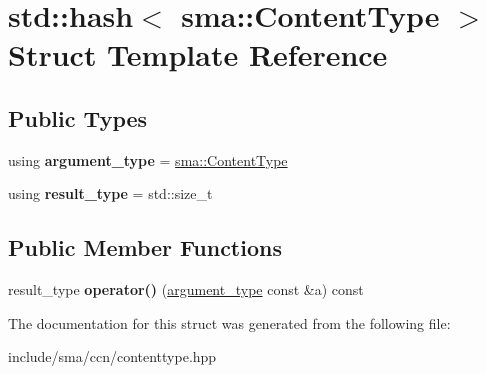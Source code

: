 \hypertarget{structstd_1_1hash_3_01sma_1_1ContentType_01_4}{\section{std\-:\-:hash$<$ sma\-:\-:Content\-Type $>$ Struct Template Reference}
\label{structstd_1_1hash_3_01sma_1_1ContentType_01_4}
}
\subsection*{Public Types}
\begin{DoxyCompactItemize}
\item 
\hypertarget{structstd_1_1hash_3_01sma_1_1ContentType_01_4_aa6f30018c2283fec5c14d3bded616b05}{using {\bfseries argument\-\_\-type} = \hyperlink{structsma_1_1ContentType}{sma\-::\-Content\-Type}}\label{structstd_1_1hash_3_01sma_1_1ContentType_01_4_aa6f30018c2283fec5c14d3bded616b05}

\item 
\hypertarget{structstd_1_1hash_3_01sma_1_1ContentType_01_4_a48c332fb1e0d1a96ee083d9e77f77e97}{using {\bfseries result\-\_\-type} = std\-::size\-\_\-t}\label{structstd_1_1hash_3_01sma_1_1ContentType_01_4_a48c332fb1e0d1a96ee083d9e77f77e97}

\end{DoxyCompactItemize}
\subsection*{Public Member Functions}
\begin{DoxyCompactItemize}
\item 
\hypertarget{structstd_1_1hash_3_01sma_1_1ContentType_01_4_a8c72d9477b7fb948ef782ecd7ee86fb6}{result\-\_\-type {\bfseries operator()} (\hyperlink{structsma_1_1ContentType}{argument\-\_\-type} const \&a) const }\label{structstd_1_1hash_3_01sma_1_1ContentType_01_4_a8c72d9477b7fb948ef782ecd7ee86fb6}

\end{DoxyCompactItemize}


The documentation for this struct was generated from the following file\-:\begin{DoxyCompactItemize}
\item 
include/sma/ccn/contenttype.\-hpp\end{DoxyCompactItemize}
